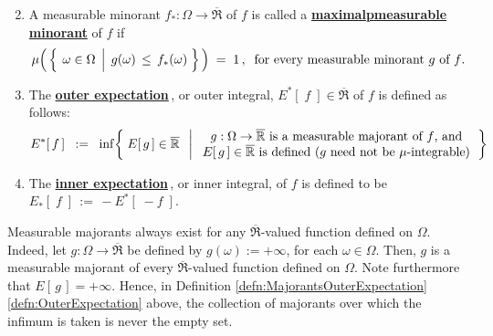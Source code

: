 \begin{definition}
\begin{enumerate}
\begin{equation*}
	\end{equation*}	
\item
	A measurable minorant $f_{*}:\Omega\longrightarrow\overline{\Re}$ of $f$
	is called a \underline{\textbf{maximal{\color{white}p}measurable minorant}} of $f$ if
	\begin{equation*}
	\mu\!\left(\,
		\left\{\;\left.\omega\overset{{\color{white}.}}{\in}\Omega\;\,\right\vert\; g(\omega) \,\leq\, f_{*}(\omega) \;\right\}
		\,\right)
	\;=\;1\,,\;\;
	\textnormal{for every measurable minorant $g$ of $f$}.
	\end{equation*}	
\item\label{defn:OuterExpectation}
	The \underline{\textbf{outer expectation}}\,, or outer integral,
	$E^{*}\!\left[\;f\;\right] \in \overline{\Re}$
	of $f$ is defined as follows:
	\begin{equation*}
	E^{*}\!\left[\,f\,\right]
	\;\; := \;\;
		\inf\!\left\{\;
			E\!\left[\,g\,\right] \in \overline{\Re}
			\;\;\left\vert\;
			\begin{array}{c}
				\textnormal{$g:\Omega\rightarrow\overline{\Re}$ is a measurable majorant of $f$, and}
				\\
				\textnormal{$E\!\left[\,g\,\right] \in \overline{\Re}$ is defined ($g$ need not be $\mu$-integrable)}
			\end{array}
			\right.
			\right\}
	\end{equation*}
\item
	The \underline{\textbf{inner expectation}}\,, or inner integral,
	of $f$ is defined to be
	$E_{*}\!\left[\;f\;\right] \, := \, - E^{*}\!\left[\;- f\;\right]$.
\end{enumerate}
\end{definition}

\begin{remark}
\mbox{}\vskip 0.1cm
\noindent
Measurable majorants always exist for any $\overline{\Re}$-valued function defined on $\Omega$.
Indeed, let $g : \Omega \longrightarrow \overline{\Re}$ be defined by $g(\omega) := +\infty$, for each $\omega \in \Omega$.
Then, $g$ is a measurable majorant of every $\overline{\Re}$-valued function defined on $\Omega$.
Note furthermore that $E\!\left[\,g\,\right] = +\infty$.
Hence, in Definition \ref{defn:MajorantsOuterExpectation} \eqref{defn:OuterExpectation} above,
the collection of majorants over which the infimum is taken is never the empty set.
\end{remark}

